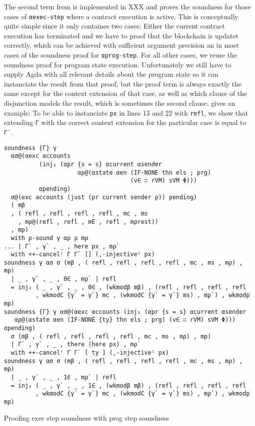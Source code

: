 The second term from  is implemented in XXX
and proves the soundness for those cases of \verb/αexec-step/
where a contract execution is active.
This is conceptually quite simple since it only containes two cases:
Either the current contract execution has terminated and we have to proof that
the blockchain is updatet correctly, which can be achieved with sufficient
argument precision an in most cases of the soundness proof for \verb/αprog-step/.
For all other cases, we reuse the soundness proof for program state execution.
Unfortunately we still have to supply Agda with all relevant details about the program state
so it can instanciate the result from that proof, but the proof term is always exactly the
same except for the context extension of that case,
as well as which clause of the disjunction models the result, which is sometimes the second clause.
 gives an example: To be able to instanciate \verb/px/ 
in lines 13 and 22 with \verb/refl/,
we show that extending \verb/Γ/ with the correct context extension for the
particular case is equal to \verb/Γ`/.

\begin{listing}[!ht]
\begin{verbatim}
soundness {Γ} γ 
  ασ@(αexc αccounts 
          (inj₁ (αpr {s = s} αcurrent αsender
                     αρ@(αstate αen (IF-NONE thn els ; prg) 
                                    (v∈ ∷ rVM) sVM Φ)))
          αpending)
  σ@(exc accounts (just (pr current sender ρ)) pending)
  ( mβ
  , ( refl , refl , refl , refl , mc , ms
    , mρ@(refl , refl , mE , refl , mρrest))
  , mp)
  with ρ-sound γ αρ ρ mρ
... | Γ` , γ` , _ , here px , mρ`
  with ++-cancelʳ Γ Γ` [] (,-injectiveˡ px)
soundness γ ασ σ (mβ , ( refl , refl , refl , refl , mc , ms , mρ) , mp)
  | _ , γ` , _ , 0∈ , mρ` | refl
  = inj₂ ( _ , γ` , _ , 0∈ , (wkmodβ mβ) , (refl , refl , refl , refl
         , wkmodC {γ` = γ`} mc , (wkmodC {γ` = γ`} ms) , mρ`) , wkmodp mp)
soundness {Γ} γ ασ@(αexc αccounts (inj₁ (αpr {s = s} αcurrent αsender
   αρ@(αstate αen (IF-NONE {ty} thn els ; prg) (v∈ ∷ rVM) sVM Φ))) αpending)
  σ (mβ , ( refl , refl , refl , refl , mc , ms , mρ) , mp)
  | Γ` , γ` , _ , there (here px) , mρ`
  with ++-cancelʳ Γ Γ` [ ty ] (,-injectiveˡ px)
soundness γ ασ σ (mβ , ( refl , refl , refl , refl , mc , ms , mρ) , mp)
  | _ , γ` , _ , 1∈ , mρ` | refl
  = inj₂ ( _ , γ` , _ , 1∈ , (wkmodβ mβ) , (refl , refl , refl , refl
         , wkmodC {γ` = γ`} mc , (wkmodC {γ` = γ`} ms) , mρ`) , wkmodp mp)
\end{verbatim}
\caption{Proofing exec step soundness with prog step soundness}
\label{exec2progstep-soundness}
\end{listing}

